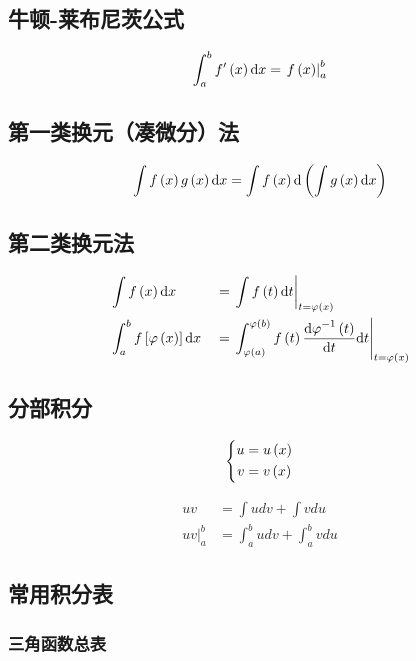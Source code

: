 \documentclass{article}
\begin{document}
\subsection{牛顿-莱布尼茨公式}

\[\int_a^b{f^\prime\left(x\right)\mathrm d x}=\left.f\left(x\right)\right|_a^b\]

\subsection{第一类换元（凑微分）法}

\[\int f\left(x\right)g\left(x\right)\mathrm d x=\int f\left(x\right)\mathrm d\left(\int g\left(x\right)\mathrm d x\right)\]

\subsection{第二类换元法}

\[\begin{aligned}
         & \int f\left(x\right)\mathrm d x                        &  & =\left.\int f\left(t\right)\mathrm d t\right|_{t=\varphi\left(x\right)}                                                                   \\
         & \int_a^bf\left[\varphi\left(x\right)\right]\mathrm d x &  & =\left.\int_{\varphi\left(a\right)}^{\varphi\left(b\right)}{f\left(t\right)\frac{{\mathrm d\varphi}^{-1}\left(t\right)}{ \mathrm d t}\mathrm d t}\right|_{t=\varphi\left(x\right)}
    \end{aligned}\]

\subsection{分部积分}

\[\left\{\begin{aligned}
        u & =u\left(x\right) \\
        v & =v\left(x\right)\end{aligned}\right.\]

\[\begin{aligned}
        uv                  & =\int{udv}+\int{vdu}         \\
        \left.uv\right|_a^b & =\int_a^b{udv}+\int_a^b{vdu}\end{aligned}\]

\subsection{常用积分表}

\subsubsection{三角函数总表}
\end{document}
